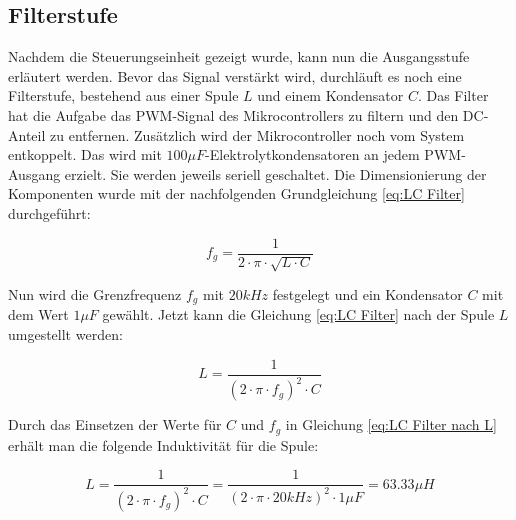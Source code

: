 
\subsection{Filterstufe}\label{sec:filterstufe}
Nachdem die Steuerungseinheit gezeigt wurde, kann nun die Ausgangsstufe erläutert werden. Bevor das Signal verstärkt wird, durchläuft es noch eine Filterstufe, bestehend aus einer Spule $L$ und einem Kondensator $C$. Das Filter hat die Aufgabe das PWM-Signal des Mikrocontrollers zu filtern und den DC-Anteil zu entfernen. Zusätzlich wird der Mikrocontroller noch vom System entkoppelt. Das wird mit $100\mu F$-Elektrolytkondensatoren an jedem PWM-Ausgang erzielt. Sie werden jeweils seriell geschaltet. Die Dimensionierung der Komponenten wurde mit der nachfolgenden Grundgleichung \ref{eq:LC Filter} durchgeführt:
 
\begin{equation}
f_g = \frac{1}{2\cdot \pi \cdot \sqrt{L\cdot C}}
\label{eq:LC Filter}
\end{equation}

Nun wird die Grenzfrequenz $f_g$ mit $20 kHz$ festgelegt und ein Kondensator $C$ mit dem Wert $1\mu F$ gewählt. Jetzt kann die Gleichung \ref{eq:LC Filter} nach der Spule $L$ umgestellt werden:

\begin{equation}
L = \frac{1}{(2\cdot \pi \cdot f_g)^2\cdot C }
\label{eq:LC Filter nach L}
\end{equation}

Durch das Einsetzen der Werte für $C$ und $f_g$ in Gleichung \ref{eq:LC Filter nach L} erhält man die folgende Induktivität für die Spule:

\begin{equation}
L = \frac{1}{(2\cdot \pi \cdot f_g)^2\cdot C } = \frac{1}{(2\cdot \pi \cdot 20 kHz)^2\cdot 1 \mu F } = 63.33\mu H
\label{eq:LC Filter nach L 1}
\end{equation}

